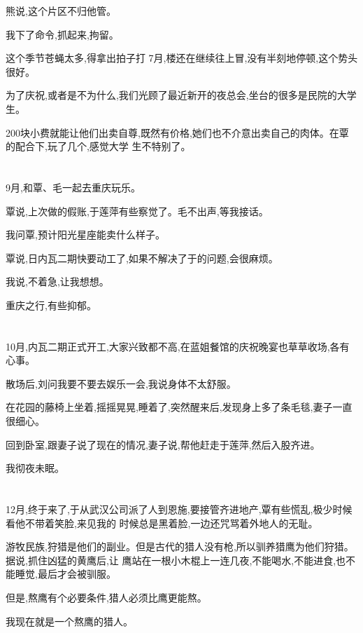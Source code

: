 \documentclass[11pt]{article}
\begin{document}
熊说,这个片区不归他管。

我下了命令,抓起来,拘留。

这个季节苍蝇太多,得拿出拍子打 7月,楼还在继续往上冒,没有半刻地停顿,这个势头很好。

为了庆祝,或者是不为什么,我们光顾了最近新开的夜总会,坐台的很多是民院的大学生。

200块小费就能让他们出卖自尊,既然有价格,她们也不介意出卖自己的肉体。在覃的配合下,玩了几个,感觉大学
生不特别了。

\section{}
9月,和覃、毛一起去重庆玩乐。

覃说,上次做的假账,于莲萍有些察觉了。毛不出声,等我接话。

我问覃,预计阳光星座能卖什么样子。

覃说,日内瓦二期快要动工了,如果不解决了于的问题,会很麻烦。

我说,不着急,让我想想。

重庆之行,有些抑郁。



\section{}
10月,内瓦二期正式开工,大家兴致都不高,在蓝姐餐馆的庆祝晚宴也草草收场,各有心事。

散场后,刘问我要不要去娱乐一会,我说身体不太舒服。

在花园的藤椅上坐着,摇摇晃晃,睡着了,突然醒来后,发现身上多了条毛毯,妻子一直很细心。

回到卧室,跟妻子说了现在的情况,妻子说,帮他赶走于莲萍,然后入股齐进。

我彻夜未眠。



\section{}
12月,终于来了,于从武汉公司派了人到恩施,要接管齐进地产,覃有些慌乱,极少时候看他不带着笑脸,来见我的
时候总是黑着脸,一边还咒骂着外地人的无耻。

游牧民族,狩猎是他们的副业。但是古代的猎人没有枪,所以驯养猎鹰为他们狩猎。据说,抓住凶猛的黄鹰后,让
鹰站在一根小木棍上一连几夜,不能喝水,不能进食,也不能睡觉,最后才会被驯服。

但是,熬鹰有个必要条件,猎人必须比鹰更能熬。

我现在就是一个熬鹰的猎人。
\end{document}
